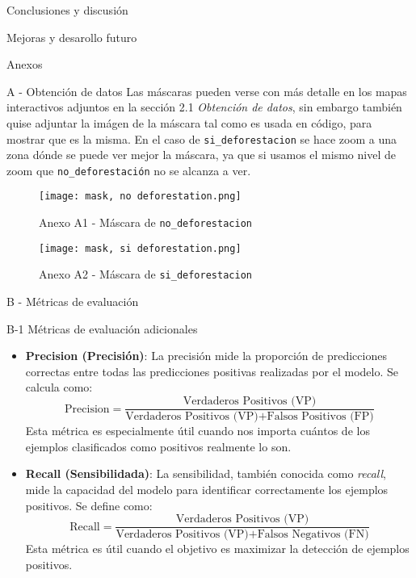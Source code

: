 \documentclass[11pt]{article}
\begin{document}
\begin{section}{Conclusiones y discusión}
\begin{subsection}{Mejoras y desarollo futuro}
\end{subsection}
\end{section}

\begin{section}{Anexos}
\begin{subsection}{A - Obtención de datos}
Las máscaras pueden verse con más detalle en los mapas interactivos adjuntos en la sección 2.1 \textit{Obtención de datos}, sin embargo también quise adjuntar la imágen de la máscara tal como es usada en código, para mostrar que es la misma. En el caso de \texttt{si\_deforestacion} se hace zoom a una zona dónde se puede ver mejor la máscara, ya que si usamos el mismo nivel de zoom que \texttt{no\_deforestación} no se alcanza a ver. 

\begin{figure}[H]
    \centering
    \texttt{[image: mask, no deforestation.png]}
    \caption{Anexo A1 - Máscara de \texttt{no\_deforestacion}}
    \label{fig:imagename}
\end{figure}

\begin{figure}[H]
    \centering
    \texttt{[image: mask, si deforestation.png]}
    \caption{Anexo A2 - Máscara de \texttt{si\_deforestacion}}
    \label{fig:imagename}
\end{figure}
    
\end{subsection}

\begin{subsection}{B - Métricas de evaluación}
\begin{subsubsection}{B-1 Métricas de evaluación adicionales}
    \begin{itemize}

    \item \textbf{Precision (Precisión)}: La precisión mide la proporción de predicciones correctas entre todas las predicciones positivas realizadas por el modelo. Se calcula como:
    \[
    \text{Precision} = \frac{\text{Verdaderos Positivos (VP)}}{\text{Verdaderos Positivos (VP)} + \text{Falsos Positivos (FP)}}
    \]
    Esta métrica es especialmente útil cuando nos importa cuántos de los ejemplos clasificados como positivos realmente lo son.

    \item \textbf{Recall (Sensibilidada)}: La sensibilidad, también conocida como \textit{recall}, mide la capacidad del modelo para identificar correctamente los ejemplos positivos. Se define como:
    \[
    \text{Recall} = \frac{\text{Verdaderos Positivos (VP)}}{\text{Verdaderos Positivos (VP)} + \text{Falsos Negativos (FN)}}
    \]
    Esta métrica es útil cuando el objetivo es maximizar la detección de ejemplos positivos.


\end{itemize}
\end{subsubsection}
\end{subsection}
\end{section}
\end{document}
